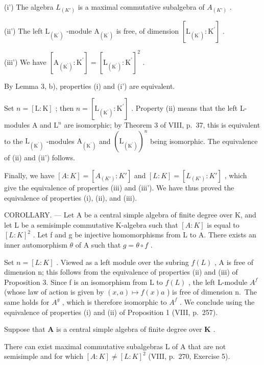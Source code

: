 (i') The algebra \(L_{(K')}\) is a maximal commutative subalgebra of \(A_{(K')}\) .

(ii') The left \(\mathrm{L}_{(\mathrm{K}^{\prime})}\) -module \(\mathrm{A}_{(\mathrm{K}^{\prime})}\) is free, of dimension \([\mathrm{L}_{(\mathrm{K}^{\prime})}:\mathrm{K}^{\prime}]\) .

(iii') We have \(\left[\mathrm{A}_{\left(\mathrm{K}^{\prime}\right)}:\mathrm{K}^{\prime}\right] = \left[\mathrm{L}_{\left(\mathrm{K}^{\prime}\right)}:\mathrm{K}^{\prime}\right]^{2}\) .

By Lemma 3, b), properties (i) and (i') are equivalent.

Set \(n = [\mathrm{L}:\mathrm{K}]\) ; then \(n = [\mathrm{L}_{(\mathrm{K}^{\prime})}:\mathrm{K}^{\prime}]\) . Property (ii) means that the left L-modules A and \(\mathrm{L}^n\) are isomorphic; by Theorem 3 of VIII, p.~37, this is equivalent to the \(\mathrm{L}_{(\mathrm{K}^{\prime})}\) -modules \(\mathrm{A}_{(\mathrm{K}^{\prime})}\) and \((\mathrm{L}_{(\mathrm{K}^{\prime})})^n\) being isomorphic. The equivalence of (ii) and (ii') follows.

Finally, we have \([A:K]=[A_{(K')}:K']\) and \([L:K]=[L_{(K')}:K']\) , which give the equivalence of properties (iii) and (iii'). We have thus proved the equivalence of properties (i), (ii), and (iii).

COROLLARY. --- Let A be a central simple algebra of finite degree over K, and let L be a semisimple commutative K-algebra such that \([A:K]\) is equal to \([L:K]^{2}\) . Let f and g be injective homomorphisms from L to A. There exists an inner automorphism \(\theta\) of A such that \(g = \theta \circ f\) .

Set \(n = [L : K]\) . Viewed as a left module over the subring \(f(L)\) , A is free of dimension n; this follows from the equivalence of properties (ii) and (iii) of Proposition 3. Since f is an isomorphism from L to \(f(L)\) , the left L-module \(A^{f}\) (whose law of action is given by \((x, a) \mapsto f(x)a\) ) is free of dimension n.~The same holds for \(A^{g}\) , which is therefore isomorphic to \(A^{f}\) . We conclude using the equivalence of properties (i) and (ii) of Proposition 1 (VIII, p.~257).

Suppose that \(\mathbf{A}\) is a central simple algebra of finite degree over \(\mathbf{K}\) .

There can exist maximal commutative subalgebras L of A that are not semisimple and for which \([A:K]\neq[L:K]^{2}\) (VIII, p.~270, Exercise 5).

